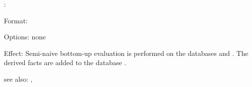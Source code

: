\eval:

Format: 

Options: none

Effect: Semi-naive bottom-up evaluation is performed on the databases 
	 and . The derived facts are added to the 
	database .

see also: , 


